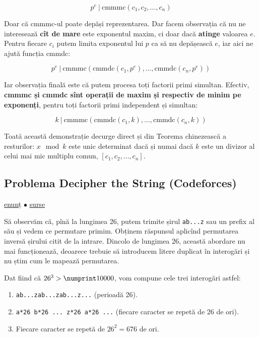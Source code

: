 \documentclass[../main.tex]{subfiles}
\begin{document}
$$p^e \ | \ \text{cmmmc}(c_1, c_2, \dots, c_n)$$

Doar că cmmmc-ul poate depăși reprezentarea. Dar facem observația că nu ne interesează \textbf{cît de mare} este exponentul maxim, ci doar dacă \textbf{atinge} valoarea $e$. Pentru fiecare $c_i$ putem limita exponentul lui $p$ ca să nu depășească $e$, iar aici ne ajută funcția cmmdc:

$$p^e \ | \ \text{cmmmc}(\text{cmmdc}(c_1, p^e), \dots, \text{cmmdc}(c_n, p^e))$$

Iar observația finală este că putem procesa toți factorii primi simultan. Efectiv, \textbf{cmmmc și cmmdc sînt operații de maxim și respectiv de minim pe exponenți}, pentru toți factorii primi independent și simultan:

$$k \ | \ \text{cmmmc}(\text{cmmdc}(c_1, k), \dots, \text{cmmdc}(c_n, k))$$

Toată această demonstrație decurge direct și din Teorema chinezească a resturilor: $x \mod k$ este unic determinat dacă și numai dacă $k$ este un divizor al celui mai mic multiplu comun, $[c_1, c_2, \dots, c_n]$.


\subsection{Problema Decipher the String (Codeforces)}
\label{problem:decipher-the-string}

\href{https://codeforces.com/contest/1117/problem/E}{enunț}
$\bullet$
\hyperref[code:decipher-the-string]{surse}

Să observăm că, pînă la lungimea 26, putem trimite șirul \texttt{ab...z} sau un prefix al său și vedem ce permutare primim. Obținem răspunsul aplicînd permutarea inversă șirului citit de la intrare. Dincolo de lungimea 26, această abordare nu mai funcționează, deoarece trebuie să introducem litere duplicat în interogări și nu știm cum le mapează permutarea.

Dat fiind că $26^3 > \np{10000}$, vom compune cele trei interogări astfel:

\begin{enumerate}
  \item \texttt{ab...zab...zab...z...} (perioadă 26).
  \item \texttt{a*26 b*26 ... z*26 a*26 ...} (fiecare caracter se repetă de 26 de ori).
  \item Fiecare caracter se repetă de $26^2=676$ de ori.
\end{enumerate}
\end{document}
